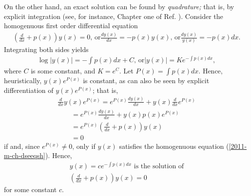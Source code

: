 On the other hand, an exact solution can be found by {\em quadrature;}
that is, by explicit integration (see, for instance, Chapter one of Ref. \cite{birkhoff-Rota-48}).
Consider the homogenuous first order differential equation
\begin{equation}
\begin{array}{l}
\left(\frac{d}{dx} + p(x)  \right)  y(x)=0\textrm{, or}
\frac{dy(x)}{dx} = - p(x)   y(x) \textrm{, or}
\frac{dy(x)}{ y(x) } = - p(x) dx .
\end{array}
\label{2011-m-ch-dseeqsh}
\end{equation}
Integrating both sides yields
\begin{equation}
\begin{array}{l}
\log \vert y(x)\vert =  - \int p(x) dx +C \textrm{, or}
\vert y(x)\vert =K e^{- \int p(x) dx},
\end{array}
\label{2011-m-ch-dseedi}
\end{equation}
where $C$ is some constant, and $K=e^C$.
Let $P(x)={ \int p(x) dx}$. Hence, heuristically,
$y(x)e^{P(x)}$ is constant, as can also be seen by explicit differentiation of $y(x)e^{P(x)}$; that is,
\begin{equation}
\begin{array}{l}
\frac{d}{dx}y(x)e^{P(x)}
=  e^{P(x)}\frac{dy(x)}{dx}   +  y(x)\frac{d}{dx} e^{P(x)}\\
\qquad =
e^{P(x)}\frac{dy(x)}{dx}   +  y(x)  p(x) e^{P(x)}\\
\qquad =
e^{P(x)}\left(\frac{d}{dx}   +   p(x) \right)y(x)\\
\qquad = 0
\end{array}
\label{2011-m-ch-dseeed}
\end{equation}
if and, since $ e^{P(x)}\neq 0$,
only if $y(x)$ satisfies the homogenuous equation  (\ref{2011-m-ch-dseeqsh}).
Hence,
\begin{equation}
\begin{array}{l}
y(x)  =c e^{- \int p(x) dx} \textrm { is the solution of}\\
\left(\frac{d}{dx} + p(x)  \right)  y(x)=0
\end{array}
\label{2011-m-ch-dseesoh}
\end{equation}
for some constant $c$.



